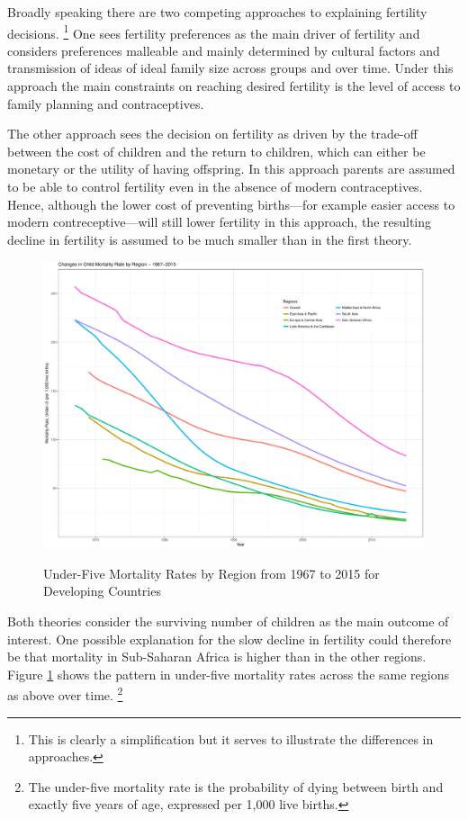 \documentclass[letterpaper,12pt]{article}
\begin{document}
Broadly speaking there are two competing approaches to explaining
fertility decisions.%
\footnote{
This is clearly a simplification but it serves to illustrate the
differences in approaches.}
One sees fertility preferences as the main driver of fertility and
considers preferences malleable and mainly determined by cultural
factors and transmission of ideas of ideal family size across groups and
over time.
Under this approach the main constraints on reaching desired fertility
is the level of access to family planning and contraceptives.

The other approach sees the decision on fertility as driven by the
trade-off between the cost of children and the return to children, which
can either be monetary or the utility of having offspring.
In this approach parents are assumed to be able to control fertility
even in the absence of modern contraceptives.
Hence, although the lower cost of preventing births---for example easier
access to modern contreceptive---will still lower fertility in this
approach, the resulting decline in fertility is assumed to be much
smaller than in the first theory.

\begin{figure}[hp!]
    \centering
    \caption{Under-Five Mortality Rates by Region from 1967 to 2015 for Developing Countries}
    \includegraphics[width=0.75\linewidth]{../figures/childMortalityRates.pdf}
    \label{fig:mortality}
\end{figure}

Both theories consider the surviving number of children as the main
outcome of interest.
One possible explanation for the slow decline in fertility could
therefore be that mortality in Sub-Saharan Africa is higher than in the
other regions.
Figure \ref{fig:mortality} shows the pattern in under-five mortality rates 
across the same regions as above over time.%
\footnote{
The under-five mortality rate is the probability of dying between birth and 
exactly five years of age, expressed per 1,000 live births.
}
\end{document}
